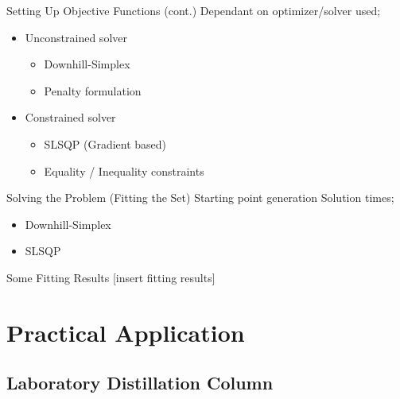 \documentclass{beamer}
\begin{document}
\begin{frame}{Setting Up Objective Functions (cont.)}
Dependant on optimizer/solver used;
\begin{itemize}
  \item
    Unconstrained solver
    \begin{itemize}
      \item
        Downhill-Simplex
      \item
        Penalty formulation
    \end{itemize}
  \item
    Constrained solver
    \begin{itemize}
      \item
        SLSQP (Gradient based)
      \item
        Equality / Inequality constraints
    \end{itemize}
\end{itemize}
\end{frame}


\begin{frame}{Solving the Problem (Fitting the Set)}
Starting point generation
\vfill
Solution times;
\begin{itemize}
  \item
    Downhill-Simplex
  \item
    SLSQP
\end{itemize}
\vfill
\end{frame}

\begin{frame}{Some Fitting Results}
[insert fitting results]
\end{frame}


\section{Practical Application}

\subsection{Laboratory Distillation Column}
\end{document}
